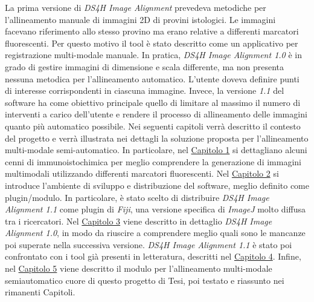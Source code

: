     \noindent La prima versione di \textit{DS4H Image Alignment} prevedeva metodiche per l’allineamento manuale di immagini 2D di provini istologici. Le immagini facevano riferimento allo stesso provino ma erano relative a differenti marcatori fluorescenti. Per questo motivo il tool è stato descritto come un applicativo per registrazione multi-modale manuale. In pratica, \textit{DS4H Image Alignment 1.0} è in grado di gestire immagini di dimensione e scala differente, ma non presenta nessuna metodica per l’allineamento automatico. L’utente doveva definire punti di interesse corrispondenti in ciascuna immagine. Invece, la versione \textit{1.1} del software ha come obiettivo principale quello di limitare al massimo il numero di interventi a carico dell'utente e rendere il processo di allineamento delle immagini quanto più automatico possibile.\hfill \break
    \noindent Nei seguenti capitoli verrà descritto il contesto del progetto e verrà illustrata nei dettagli la soluzione proposta per l’allineamento multi-modale semi-automatico. In particolare, nel \hyperref[chap:histology]{Capitolo 1} si dettagliano alcuni cenni di immunoistochimica per meglio comprendere la generazione di immagini multimodali utilizzando differenti marcatori fluorescenti. Nel \hyperref[chap:plugins]{Capitolo 2} si introduce l’ambiente di sviluppo e distribuzione del software, meglio definito come plugin/modulo. In particolare, è stato scelto di distribuire \textit{DS4H Image Alignment 1.1} come plugin di \textit{Fiji}, una versione specifica di \textit{ImageJ} molto diffusa tra i ricercatori. Nel \hyperref[chap:descriptionoldtool]{Capitolo 3} viene descritto in dettaglio \textit{DS4H Image Alignment 1.0}, in modo da riuscire a comprendere meglio quali sono le mancanze poi superate nella successiva versione. \textit{DS4H Image Alignment 1.1} è stato poi confrontato con i tool già presenti in letteratura, descritti nel \hyperref[chap:competitors]{Capitolo 4}. Infine, nel \hyperref[chap:descriptionnewtool]{Capitolo 5} viene descritto il modulo per l’allineamento multi-modale semiautomatico cuore di questo progetto di Tesi, poi testato e riassunto nei rimanenti Capitoli.